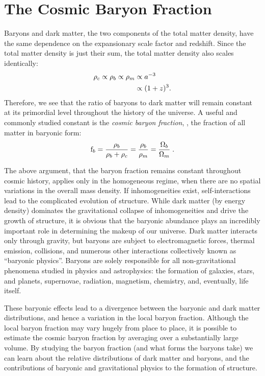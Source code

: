 \section{The Cosmic Baryon Fraction}
\label{sec:Intro.Baryons}
Baryons and dark matter, the two components of the total matter
density, have the same dependence on the expansionary scale factor
and redshift. Since the total matter density is just their sum, the
total matter density also scales identically:
\begin{align}
\rho_c \propto \rho_b \propto \rho_m & \propto a^{-3} \nonumber \\
& \propto (1+z)^{3}. \nonumber
\end{align}
Therefore, we see that the ratio of baryons to dark matter will remain
constant at its primordial level throughout the history of the
universe. A useful and commonly studied constant is the \textit{cosmic
  baryon fraction}, \fb, the fraction of all matter in baryonic form:
\begin{equation}
\textrm{f\ensuremath{_b}} = \frac{\rho_b}{\rho_b + \rho_c} = \frac{\rho_b}{\rho_m} =
\frac{\Omega_b}{\Omega_m}\;.
\end{equation}

The above argument, that the baryon fraction remains constant
throughout cosmic history, applies only in the homogeneous regime,
when there are no spatial variations in the overall mass density. If
inhomogeneities exist, self-interactions lead to the complicated
evolution of structure. While dark matter (by energy density)
dominates the gravitational collapse of inhomogeneities and drive the
growth of structure, it is obvious that the baryonic abundance plays
an incredibly important role in determining the makeup of our
universe. Dark matter interacts only through gravity, but baryons are
subject to electromagnetic forces, thermal emission, collisions, and
numerous other interactions collectively known as ``baryonic
physics''. Baryons are solely responsible for all non-gravitational
phenomena studied in physics and astrophysics: the formation of
galaxies, stars, and planets, supernovae, radiation, magnetism,
chemistry, and, eventually, life itself. 

These baryonic effects lead to a divergence between the baryonic and
dark matter distributions, and hence a variation in the local baryon
fraction. Although the local baryon fraction may vary hugely from
place to place, it is possible to estimate the cosmic baryon fraction
by averaging over a substantially large volume. By studying the baryon
fraction (and what forms the baryons take) we can learn about the
relative distributions of dark matter and baryons, and the
contributions of baryonic and gravitational physics to the formation
of structure.

